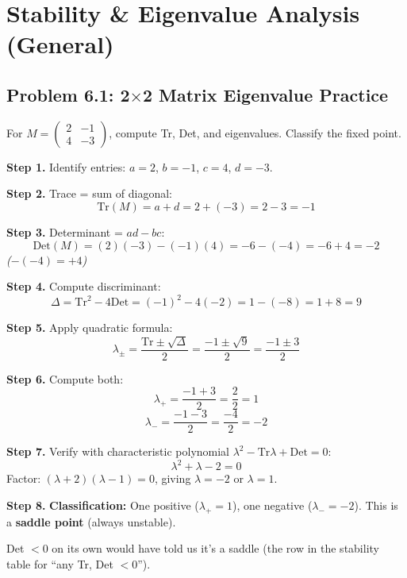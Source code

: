 \documentclass[10pt]{article}
\newcommand{\stepwhy}[1]{\textcolor{blue!60!black}{\small\textit{(#1)}}}
\begin{document}
\newpage
\section{Stability \& Eigenvalue Analysis (General)}

\subsection{Problem 6.1: 2$\times$2 Matrix Eigenvalue Practice}

\begin{problem}
For $M = \begin{pmatrix} 2 & -1 \\ 4 & -3 \end{pmatrix}$, compute Tr, Det, and eigenvalues. Classify the fixed point.
\end{problem}

\begin{solution}
\textbf{Step 1.} Identify entries: $a = 2$, $b = -1$, $c = 4$, $d = -3$.

\textbf{Step 2.} Trace = sum of diagonal:
\[
\text{Tr}(M) = a + d = 2 + (-3) = 2 - 3 = -1
\]

\textbf{Step 3.} Determinant = $ad - bc$:
\[
\text{Det}(M) = (2)(-3) - (-1)(4) = -6 - (-4) = -6 + 4 = -2
\]
\stepwhy{$-(-4) = +4$}

\textbf{Step 4.} Compute discriminant:
\[
\Delta = \text{Tr}^2 - 4\text{Det} = (-1)^2 - 4(-2) = 1 - (-8) = 1 + 8 = 9
\]

\textbf{Step 5.} Apply quadratic formula:
\[
\lambda_\pm = \frac{\text{Tr} \pm \sqrt\Delta}{2} = \frac{-1 \pm \sqrt 9}{2} = \frac{-1 \pm 3}{2}
\]

\textbf{Step 6.} Compute both:
\[
\lambda_+ = \frac{-1 + 3}{2} = \frac{2}{2} = 1
\]
\[
\lambda_- = \frac{-1 - 3}{2} = \frac{-4}{2} = -2
\]

\textbf{Step 7.} Verify with characteristic polynomial $\lambda^2 - \text{Tr}\lambda + \text{Det} = 0$:
\[
\lambda^2 + \lambda - 2 = 0
\]
Factor: $(\lambda + 2)(\lambda - 1) = 0$, giving $\lambda = -2$ or $\lambda = 1$. \checkmark

\textbf{Step 8.} \textbf{Classification:} One positive ($\lambda_+ = 1$), one negative ($\lambda_- = -2$). This is a \textbf{saddle point} (always unstable).

Det $< 0$ on its own would have told us it's a saddle (the row in the stability table for ``any Tr, Det $< 0$'').
\end{solution}
\end{document}
